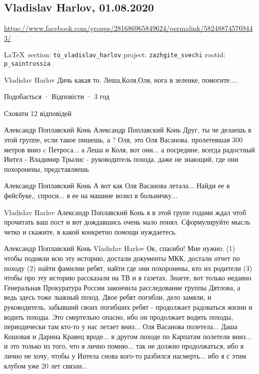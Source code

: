  
 
\subsection{Vladislav Harlov, 01.08.2020}
\url{https://www.facebook.com/groups/281686965849624/permalink/582488745769443/}
  
\vspace{0.5cm}
{\small\LaTeX~section: \verb|to_vladislav_harlov| project: \verb|zazhgite_svechi| rootid: \verb|p_saintrussia|}
\vspace{0.5cm}

Vladislav Harlov Дичь какая то. Леша,Коля,Оля, нога в зеленке, помогите....

		Подобається · Відповісти · 3 год

Сховати 12 відповідей

		Александр Поплавский Конь Александр Поплавский Конь Друг, ты че делаешь в
		этой группе, если такое пишешь, а ? Оля, это Оля Васанова. пролетевшая 300
		метров вниз c Петроса... а Леша и Коля, вот они... а посредине, всегда
		радостный Интел - Владимир Трылис - руководитель похода, даже не знающий,
		где они похоронены, представляешь

Александр Поплавский Конь А вот как Оля Васанова летала... Найди ее в
фейсбуке,, спроси... я ее на машине возил в больничку...

Vladislav Harlov Александр Поплавский Конь я в этой групе годами ждал чтоб
прочитать ваш пост и вот дождавшись очень мало понял. Сформулируйте мысль четко
и скажите, в какой конкретно помощи нуждаетесь.

Александр Поплавский Конь Vladislav Harlov Ок, спасибо! Мне нужно: (1) чтобы
подняли всю эту историю, достали документы МКК, достали отчет по походу (2)
найти фамилии ребят, найти где они похоронены, кто их родители (3) чтобы про
эту историю рассказали на ТВ и в газетах. Знаете, вот только недавно
Генеральная Прокуратура России закончила расследование группы Дятлова, а ведь
здесь тоже лыжный поход. Двое ребят погибли, дело замяли, и руководитель,
забывший своих погибших ребят - продолжает радоваться жизни и водить походы.
Это смертельно опасно, ибо он продолжает водить походы, периодически там кто-то
у нас летает вниз... Оля Васанова полетела... Даша Кошовая и Дарина Кравец
вроде... в другом походе по Карпатам полетели вниз... и это только из того, что
я лично помню... так не должно продолжаться, ибо я лично не хочу, чтобы у
Интела снова кого-то разбился насмерть... ибо я с этим клубом уже 20 лет
связан...

